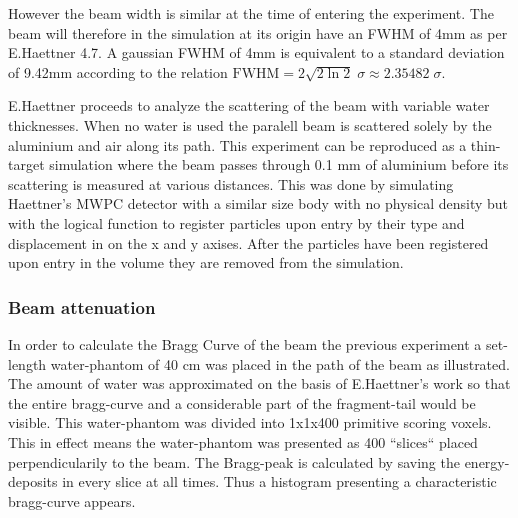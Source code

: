 However the beam width is similar at the time of entering the experiment. The beam will therefore in the simulation at its origin have an FWHM of 4mm as per E.Haettner 4.7. A gaussian FWHM of 4mm is equivalent to a standard deviation of 9.42mm according to the relation $\mathrm{FWHM} =   2 \sqrt{2 \ln 2 } \; \sigma \approx 2.35482 \; \sigma$. %

E.Haettner proceeds to analyze the scattering of the beam with variable water thicknesses. When no water is used the paralell beam is scattered solely by the aluminium and air along its path. This experiment can be reproduced as a thin-target simulation where the beam passes through 0.1 mm of aluminium before its scattering is measured at various distances. This was done by simulating Haettner's MWPC detector with a similar size body with no physical density but with the logical function to register particles upon entry by their type and displacement in on the x and y axises. After the particles have been registered upon entry in the volume they are removed from the simulation.

\subsubsection{Beam attenuation}

In order to calculate the Bragg Curve of the beam the previous experiment a set-length water-phantom of 40 cm was placed in the path of the beam as illustrated. The amount of water was approximated on the basis of E.Haettner's work so that the entire bragg-curve and a considerable part of the fragment-tail would be visible. This water-phantom was divided into 1x1x400 primitive scoring voxels. This in effect means the water-phantom was presented as 400 ``slices`` placed perpendicularily to the beam. The Bragg-peak is calculated by saving the energy-deposits in every slice at all times. Thus a histogram presenting a characteristic bragg-curve appears.








